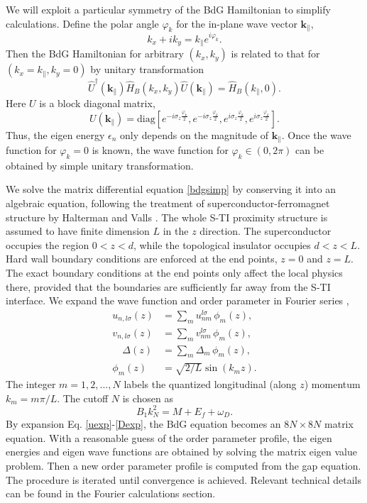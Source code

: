 \documentclass[11pt]{report}
\newcommand{\kperp}{\mathbf{k}_\parallel}
\begin{document}
We will exploit a particular symmetry of the BdG Hamiltonian to simplify 
calculations. Define the polar angle $\varphi_k$ for the in-plane wave vector $\kperp$, 
\begin{equation}
k_x+ik_y=k_{\parallel}e^{i\varphi_k}.
\end{equation}
Then the BdG Hamiltonian for arbitrary $(k_x,k_y)$ is
related to that for $(k_x=k_\parallel,k_y=0)$ by unitary transformation 
\begin{equation}
\hat{U}^\dagger(\kperp) \hat{H}_{B}(k_x,k_y) \hat{U}(\kperp) = \hat{H}_{B}(k_\parallel,0).
\label{symm}
\end{equation}
Here $U$ is a 
block diagonal matrix,
\begin{equation}
U(\kperp)=\mathrm{diag}[e^{-i\sigma_z\frac{\varphi_k}{2}}, e^{-i\sigma_z\frac{\varphi_k}{2}}, e^{i\sigma_z\frac{\varphi_k}{2}},e^{i\sigma_z\frac{\varphi_k}{2}} ]. \label{unit}
\end{equation}
Thus, the eigen energy $\epsilon_n$ only depends on the magnitude of $\kperp$.
Once the wave function for $\varphi_k=0$ is known, the wave function for $\varphi_k\in (0,2\pi)$
can be obtained by simple unitary transformation.

We solve the matrix differential equation \eqref{bdgsimp} by conserving it into an algebraic equation, 
following the treatment of superconductor-ferromagnet structure by 
Halterman and Valls \cite{h-v}. The whole S-TI proximity structure is assumed to have 
finite dimension $L$ in the $z$
direction. The superconductor occupies the region $0<z<d$,
while the topological insulator occupies $d<z<L$. Hard wall boundary conditions are enforced at the end points, 
$z=0$ and $z=L$.  
The exact boundary conditions at the end points only affect the local physics there, provided 
that the boundaries are sufficiently far away from the S-TI interface. We expand the wave function
and order parameter in Fourier series \cite{h-v},
\begin{align}
u_{n,l\sigma}(z) &= \sum_m u_{nm}^{l \sigma}\,\phi_m(z),\label{uexp}\\ 
v_{n,l\sigma}(z) &= \sum_m v_{nm}^{l \sigma}\, \phi_m(z),\\
\quad \Delta(z) &= \sum_m \Delta_{m}\, \phi_m(z) , \label{Dexp}\\
\phi_m(z)&=\sqrt{2/L}\sin(k_m z).
\end{align}
The integer $m=1,2,...,N$ labels the quantized longitudinal (along $z$) momentum $k_m=m\pi/L$. 
The cutoff $N$ is chosen as \cite{s-v}
\begin{equation}
B_1k^2_N=M+E_f+\omega_D. \label{eq-N}
\end{equation}
By expansion Eq. \eqref{uexp}-\eqref{Dexp}, the BdG equation
becomes an $8N \times 8N$ matrix equation. With a reasonable guess of the order parameter profile, 
the eigen energies and eigen wave functions are obtained by solving the matrix eigen value problem.
Then a new order parameter profile is computed from the gap equation. The procedure is iterated
until convergence is achieved.  Relevant technical details can be found
in the Fourier calculations section. 
\end{document}
